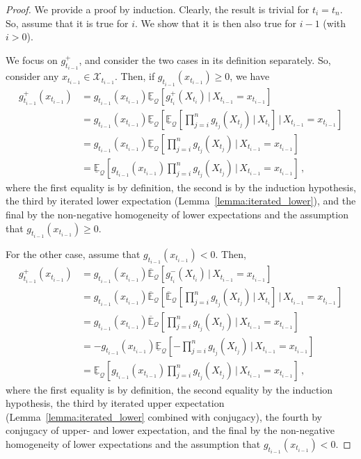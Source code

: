 \documentclass[twoside,11pt]{article}
\newcommand{\states}{\mathcal{X}}
\newcommand{\rateset}{\mathcal{Q}}
\begin{document}
\begin{proof}
We provide a proof by induction. Clearly, the result is trivial for $t_i=t_{n}$. So, assume that it is true for $i$. We show that it is then also true for $i-1$ (with $i>0$).

We focus on $g_{t_{i-1}}^+$, and consider the two cases in its definition separately. So, consider any $x_{t_{i-1}}\in\states_{t_{i-1}}$. Then, if $g_{t_{i-1}}(x_{t_{i-1}})\geq 0$, we have
\begin{align*}
g_{t_{i-1}}^+(x_{t_{i-1}}) &= g_{t_{i-1}}(x_{t_{i-1}}) \underline{\mathbb{E}}_{\rateset}\left[g_{t_{i}}^+(X_{t_{i}})\,\vert\,X_{t_{i-1}}=x_{t_{i-1}}\right] \\
 &= g_{t_{i-1}}(x_{t_{i-1}})\underline{\mathbb{E}}_{\rateset}\left[\underline{\mathbb{E}}_{\rateset}\left[\prod_{j=i}^{n}g_{t_j}(X_{t_j})\,\Bigg\vert\,X_{t_i}\right]\,\Bigg\vert\,X_{t_{i-1}}=x_{t_{i-1}}\right] \\
 &= g_{t_{i-1}}(x_{t_{i-1}})\underline{\mathbb{E}}_{\rateset}\left[\prod_{j=i}^{n}g_{t_j}(X_{t_j})\,\Bigg\vert\,X_{t_{i-1}}=x_{t_{i-1}}\right] \\ 
 &= \underline{\mathbb{E}}_{\rateset}\left[g_{t_{i-1}}(x_{t_{i-1}})\prod_{j=i}^{n}g_{t_j}(X_{t_j})\,\Bigg\vert\,X_{t_{i-1}}=x_{t_{i-1}}\right]\,,
\end{align*}
where the first equality is by definition, the second is by the induction hypothesis, the third by iterated lower expectation (Lemma~\ref{lemma:iterated_lower}), and the final by the non-negative homogeneity of lower expectations and the assumption that $g_{t_{i-1}}(x_{t_{i-1}})\geq 0$.

For the other case, assume that $g_{t_{i-1}}(x_{t_{i-1}})< 0$. Then,
\begin{align*}
g_{t_{i-1}}^+(x_{t_{i-1}}) &= g_{t_{i-1}}(x_{t_{i-1}})\overline{\mathbb{E}}_{\rateset}\left[g_{t_{i}}^-(X_{t_{i}})\,\vert\,X_{t_{i-1}}=x_{t_{i-1}}\right] \\
&= g_{t_{i-1}}(x_{t_{i-1}})\overline{\mathbb{E}}_{\rateset}\left[ \overline{\mathbb{E}}_{\rateset}\left[\prod_{j=i}^{n}g_{t_j}(X_{t_j})\,\Bigg\vert\,X_{t_i}\right]\,\Bigg\vert\,X_{t_{i-1}}=x_{t_{i-1}}\right] \\
&= g_{t_{i-1}}(x_{t_{i-1}})\overline{\mathbb{E}}_{\rateset}\left[\prod_{j=i}^{n}g_{t_j}(X_{t_j})\,\Bigg\vert\,X_{t_{i-1}}=x_{t_{i-1}}\right] \\
&= -g_{t_{i-1}}(x_{t_{i-1}})\underline{\mathbb{E}}_{\rateset}\left[-\prod_{j=i}^{n}g_{t_j}(X_{t_j})\,\Bigg\vert\,X_{t_{i-1}}=x_{t_{i-1}}\right] \\
&= \underline{\mathbb{E}}_{\rateset}\left[g_{t_{i-1}}(x_{t_{i-1}})\prod_{j=i}^{n}g_{t_j}(X_{t_j})\,\Bigg\vert\,X_{t_{i-1}}=x_{t_{i-1}}\right]\,,
\end{align*}
where the first equality is by definition, the second equality by the induction hypothesis, the third by iterated upper expectation (Lemma~\ref{lemma:iterated_lower} combined with conjugacy), the fourth by conjugacy of upper- and lower expectation, and the final by the non-negative homogeneity of lower expectations and the assumption that $g_{t_{i-1}}(x_{t_{i-1}})<0$.


\end{proof}
\end{document}
